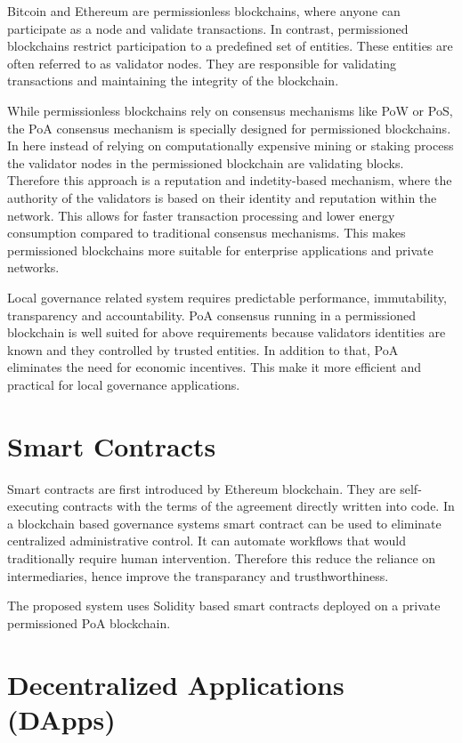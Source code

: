 Bitcoin and Ethereum are permissionless blockchains, where anyone can participate as a node and validate transactions. In contrast, permissioned blockchains restrict participation to a predefined set of entities. These entities are often referred to as validator nodes. They are responsible for validating transactions and maintaining the integrity of the blockchain. 

While permissionless blockchains rely on consensus mechanisms like \ac{PoW} or \ac{PoS}, the \ac{PoA} consensus mechanism is specially designed for permissioned blockchains. In here instead of relying on computationally expensive mining or staking process the validator nodes in the permissioned blockchain are validating blocks. Therefore this approach is a reputation and indetity-based mechanism, where the authority of the validators is based on their identity and reputation within the network. This allows for faster transaction processing and lower energy consumption compared to traditional consensus mechanisms. This makes permissioned blockchains more suitable for enterprise applications and private networks.

Local governance related system requires predictable performance, immutability, transparency and accountability. \ac{PoA} consensus running in a permissioned blockchain is well suited for above requirements because validators identities are known and they controlled by trusted entities. In addition to that, \ac{PoA} eliminates the need for economic incentives. This make it more efficient and practical for local governance applications. 

\section{Smart Contracts}

Smart contracts are first introduced by Ethereum blockchain. They are self-executing contracts with the terms of the agreement directly written into code. In a blockchain based governance systems smart contract can be used to eliminate centralized administrative control. It can automate workflows that would traditionally require human intervention. Therefore this reduce the reliance on intermediaries, hence improve the transparancy and trusthworthiness.

The proposed system uses Solidity based smart contracts deployed on a private permissioned PoA blockchain.

\section{Decentralized Applications (DApps)}

